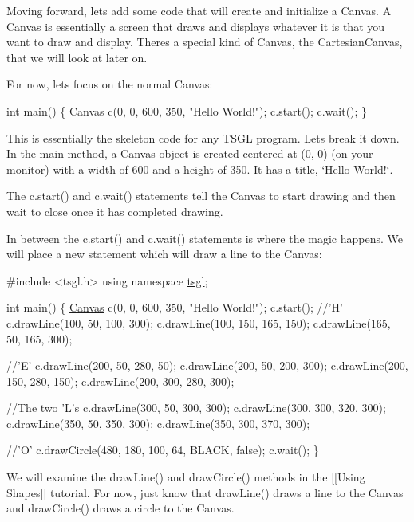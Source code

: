 Moving forward, let\textquotesingle{}s add some code that will create and initialize a Canvas. A Canvas is essentially a screen that draws and displays whatever it is that you want to draw and display. There\textquotesingle{}s a special kind of Canvas, the Cartesian\+Canvas, that we will look at later on.

For now, let\textquotesingle{}s focus on the normal Canvas\+:


\begin{DoxyCode}
\textcolor{keywordtype}{int} main() \{
  Canvas c(0, 0, 600, 350, \textcolor{stringliteral}{"Hello World!"});
  c.start();
  c.wait();
\}
\end{DoxyCode}


This is essentially the skeleton code for any T\+S\+G\+L program. Let\textquotesingle{}s break it down. In the main method, a Canvas object is created centered at (0, 0) (on your monitor) with a width of 600 and a height of 350. It has a title, \char`\"{}\+Hello World!\char`\"{}.

The c.\+start() and c.\+wait() statements tell the Canvas to start drawing and then wait to close once it has completed drawing.

In between the c.\+start() and c.\+wait() statements is where the magic happens. We will place a new statement which will draw a line to the Canvas\+:


\begin{DoxyCode}
\textcolor{preprocessor}{#include <tsgl.h>}
\textcolor{keyword}{using namespace }\hyperlink{namespacetsgl}{tsgl};

\textcolor{keywordtype}{int} main() \{
  \hyperlink{classtsgl_1_1_canvas}{Canvas} c(0, 0, 600, 350, \textcolor{stringliteral}{"Hello World!"});
  c.start();
  \textcolor{comment}{//'H'}
  c.drawLine(100, 50, 100, 300);
  c.drawLine(100, 150, 165, 150);
  c.drawLine(165, 50, 165, 300);

  \textcolor{comment}{//'E'}
  c.drawLine(200, 50, 280, 50);
  c.drawLine(200, 50, 200, 300);
  c.drawLine(200, 150, 280, 150);
  c.drawLine(200, 300, 280, 300);

  \textcolor{comment}{//The two 'L's}
  c.drawLine(300, 50, 300, 300);
  c.drawLine(300, 300, 320, 300);
  c.drawLine(350, 50, 350, 300);
  c.drawLine(350, 300, 370, 300);

  \textcolor{comment}{//'O'}
  c.drawCircle(480, 180, 100, 64, BLACK, \textcolor{keyword}{false});
  c.wait();
\}
\end{DoxyCode}


We will examine the draw\+Line() and draw\+Circle() methods in the \mbox{[}\mbox{[}Using Shapes\mbox{]}\mbox{]} tutorial. For now, just know that draw\+Line() draws a line to the Canvas and draw\+Circle() draws a circle to the Canvas.

